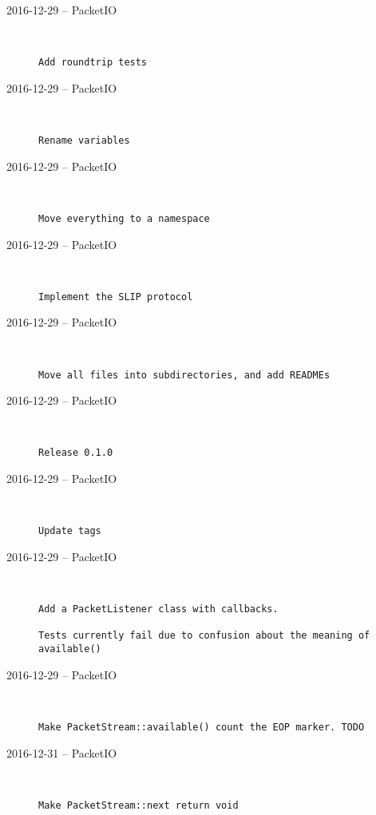 \begin{description}
  \item[2016-12-29 -- PacketIO] \hfill \
\begin{lstlisting}
Add roundtrip tests
\end{lstlisting}


  \item[2016-12-29 -- PacketIO] \hfill \
\begin{lstlisting}
Rename variables
\end{lstlisting}


  \item[2016-12-29 -- PacketIO] \hfill \
\begin{lstlisting}
Move everything to a namespace
\end{lstlisting}


  \item[2016-12-29 -- PacketIO] \hfill \
\begin{lstlisting}
Implement the SLIP protocol
\end{lstlisting}


  \item[2016-12-29 -- PacketIO] \hfill \
\begin{lstlisting}
Move all files into subdirectories, and add READMEs
\end{lstlisting}


  \item[2016-12-29 -- PacketIO] \hfill \
\begin{lstlisting}
Release 0.1.0
\end{lstlisting}


  \item[2016-12-29 -- PacketIO] \hfill \
\begin{lstlisting}
Update tags
\end{lstlisting}


  \item[2016-12-29 -- PacketIO] \hfill \
\begin{lstlisting}
Add a PacketListener class with callbacks.

Tests currently fail due to confusion about the meaning of available()
\end{lstlisting}


  \item[2016-12-29 -- PacketIO] \hfill \
\begin{lstlisting}
Make PacketStream::available() count the EOP marker. TODO
\end{lstlisting}


  \item[2016-12-31 -- PacketIO] \hfill \
\begin{lstlisting}
Make PacketStream::next return void


\end{lstlisting}
\end{description}
